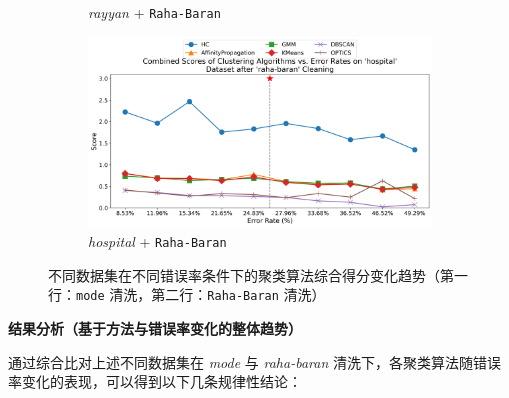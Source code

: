 \documentclass[10pt]{article} %
\numberwithin{equation}{section}
\begin{document}
\begin{figure}[htbp]
\begin{subfigure}{0.24\linewidth}
    \caption{\textit{rayyan} + \texttt{Raha-Baran}}
    \label{fig:raha_baran_rayyan}
  \end{subfigure}
  \hfill
  \begin{subfigure}{0.24\linewidth}
    \centering
    \includegraphics[width=\linewidth]{raha-baran_hospital_combined_scores.png}
    \caption{\textit{hospital} + \texttt{Raha-Baran}}
    \label{fig:raha_baran_hospital}
  \end{subfigure}

  \caption{不同数据集在不同错误率条件下的聚类算法综合得分变化趋势（第一行：\texttt{mode} 清洗，第二行：\texttt{Raha-Baran} 清洗）}
  \label{fig:all_combined_scores}
\end{figure}
\noindent
\textbf{结果分析（基于方法与错误率变化的整体趋势）}

通过综合比对上述不同数据集在 \textit{mode} 与 \textit{raha-baran} 清洗下，各聚类算法随错误率变化的表现，可以得到以下几条规律性结论：
\end{document}
